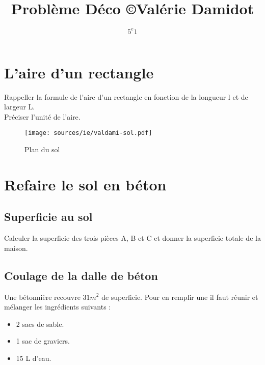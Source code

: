 \documentclass[11pt]{article}
\title{Problème Déco  \copyright Valérie Damidot} %
\author{$5^e 1$}
\begin{document}

\maketitle %



\section{L'aire d'un rectangle}
Rappeller la formule de l'aire d'un rectangle en fonction de la longueur l et de largeur L. \\
Préciser l'unité de l'aire.

\begin{figure}[H]
  \centering
  \texttt{[image: sources/ie/valdami-sol.pdf]}
  \caption{Plan du sol}
  \label{fig:ch1-plan}
\end{figure}


\section{Refaire le sol en béton}

\subsection{Superficie au sol}
Calculer la superficie des trois pièces A, B et C et donner la superficie totale de la maison.\\

\subsection{Coulage de la dalle de béton}
Une bétonnière recouvre $31m^2$ de superficie. Pour en remplir une il faut réunir et mélanger les ingrédients suivants :

\begin{itemize}
\item 2 sacs de sable.
\item 1 sac de graviers.
\item 15 L d'eau.
\end{itemize}
\end{document}
